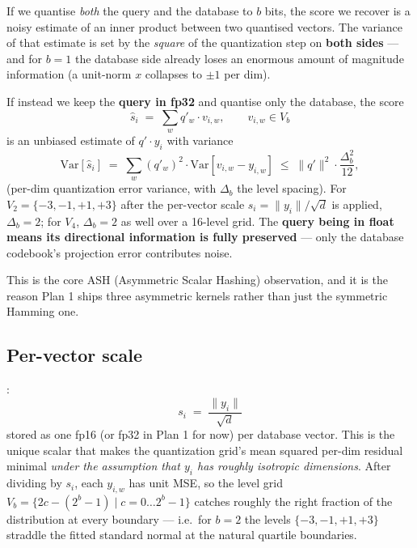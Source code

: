 \documentclass[11pt,a4paper]{article}
\begin{document}
If we quantise \emph{both} the query and the database to $b$ bits, the
score we recover is a noisy estimate of an inner product between two
quantised vectors. The variance of that estimate is set by the
\emph{square} of the quantization step on \textbf{both sides} --- and
for $b = 1$ the database side already loses an enormous amount of
magnitude information (a unit-norm $x$ collapses to $\pm 1$ per dim).

If instead we keep the \textbf{query in fp32} and quantise only the
database, the score
\begin{equation}
\hat{s}_i \;=\; \sum_{w} q'_w \cdot v_{i,w}, \qquad v_{i,w} \in V_b
\end{equation}
is an unbiased estimate of $q' \cdot y_i$ with variance
\begin{equation}
\mathrm{Var}[\hat{s}_i] \;=\; \sum_{w} (q'_w)^2 \cdot \mathrm{Var}[v_{i,w} - y_{i,w}]
\;\le\; \|q'\|^2 \cdot \frac{\Delta_b^2}{12},
\end{equation}
(per-dim quantization error variance, with $\Delta_b$ the level
spacing). For $V_2 = \{-3, -1, +1, +3\}$ after the per-vector scale
$s_i = \|y_i\|/\sqrt{d}$ is applied, $\Delta_b = 2$; for $V_4$,
$\Delta_b = 2$ as well over a 16-level grid. The \textbf{query being in
float means its directional information is fully preserved} --- only
the database codebook's projection error contributes noise.

This is the core ASH (Asymmetric Scalar Hashing) observation, and it
is the reason Plan 1 ships three asymmetric kernels rather than just
the symmetric Hamming one.

\subsection{Per-vector scale}

:
\begin{equation}
s_i \;=\; \frac{\|y_i\|}{\sqrt{d}}
\end{equation}
stored as one fp16 (or fp32 in Plan 1 for now) per database vector.
This is the unique scalar that makes the quantization grid's mean
squared per-dim residual minimal \emph{under the assumption that $y_i$
has roughly isotropic dimensions}. After dividing by $s_i$, each
$y_{i,w}$ has unit MSE, so the level grid $V_b = \{2c - (2^b - 1) \mid
c = 0\dots 2^b - 1\}$ catches roughly the right fraction of the
distribution at every boundary --- i.e.\ for $b = 2$ the levels
$\{-3, -1, +1, +3\}$ straddle the fitted standard normal at the
natural quartile boundaries.
\end{document}
